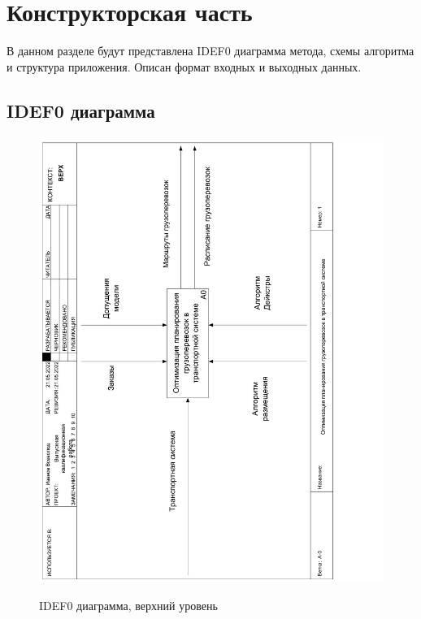 \section{Конструкторская часть}
В данном разделе будут представлена IDEF0 диаграмма метода, схемы алгоритма и структура приложения. Описан формат входных и выходных данных.

\subsection{IDEF0 диаграмма}
\begin{figure}[h]
	\begin{center}
		{\includegraphics[scale=0.5, angle=-90, page=1]{img/idef0.pdf}}
		\caption{IDEF0 диаграмма, верхний уровень}
		\label{idef0:top}
	\end{center}
\end{figure}

